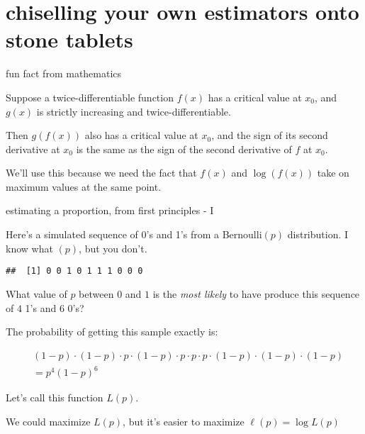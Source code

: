 \documentclass[ignorenonframetext,aspectratio=169]{beamer}
\begin{document}
\section{chiselling your own estimators onto stone
tablets}\label{chiselling-your-own-estimators-onto-stone-tablets}

\begin{frame}{fun fact from mathematics}

Suppose a twice-differentiable function \(f(x)\) has a critical value at
\(x_0\), and \(g(x)\) is strictly increasing and twice-differentiable.

Then \(g(f(x))\) also has a critical value at \(x_0\), and the sign of
its second derivative at \(x_0\) is the same as the sign of the second
derivative of \(f\) at \(x_0\).

\pause We'll use this because we need the fact that \(f(x)\) and
\(\log(f(x))\) take on maximum values at the same point.

\end{frame}

\begin{frame}[fragile]{estimating a proportion, from first principles -
I}

Here's a simulated sequence of 0's and 1's from a Bernoulli\((p)\)
distribution. I know what \((p)\), but you don't.

\begin{verbatim}
##  [1] 0 0 1 0 1 1 1 0 0 0
\end{verbatim}

What value of \(p\) between \(0\) and \(1\) is the \textit{most likely}
to have produce this sequence of \(4\) 1's and \(6\) 0's?

\pause The probability of getting this sample exactly is:

\begin{align*}
& (1-p)\cdot (1-p)\cdot p\cdot (1-p)\cdot p\cdot p\cdot p\cdot (1-p)\cdot (1-p)\cdot (1-p) \\
&= p^4(1-p)^6
\end{align*}

Let's call this function \(L(p)\).

\pause We could maximize \(L(p)\), but it's easier to maximize
\(\ell(p) = \log{L(p)}\)

\end{frame}
\end{document}
